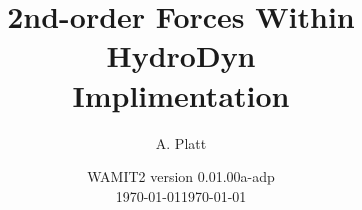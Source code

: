 \documentclass[10pt,letterpaper,oneside]{book}
\title{2nd-order Forces Within HydroDyn\\ {\large Implimentation}}
\date{WAMIT2 version 0.01.00a-adp\\ \today}
\author{A. Platt}
\date{\today}
\begin{document}
\newcommand{\HD}{HydroDyn\xspace}
\newcommand{\iu}{{i\mkern1.5mu}}       %

\newcommand{\var}[8]{\texttt{#1} &{#2}&{#3}&{#4}&{#5}&{#6}&{#7}&\parbox{5cm}{\vskip 3pt \setlength\baselineskip{5pt}#8\vskip 3pt}}
\newcommand{\rname}[1]{\texttt{#1}}    %
\newcommand{\fname}[1]{\emph{#1}}      %
\newcommand{\modname}[1]{\emph{#1}}      %
\newcommand{\vname}[1]{\texttt{#1}}    %
\newcommand{\varname}[1]{\texttt{#1}}    %

   

%

















%

\cleardoublepage
%

\label{sec:Bib}



%
%
\end{document}
